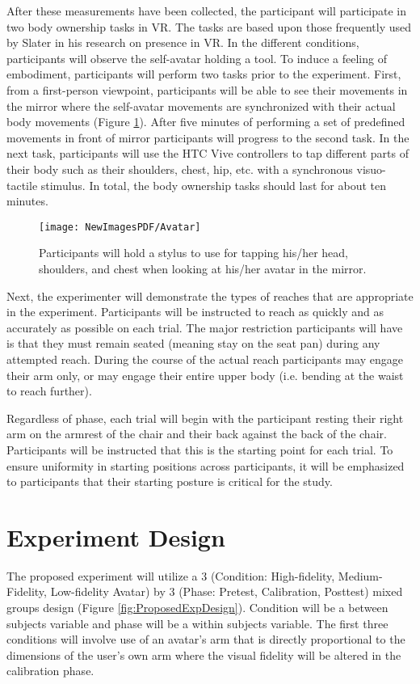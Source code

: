 After these measurements have been collected, the participant will participate in two body ownership tasks in VR. The tasks are based upon those frequently used by Slater in his research on presence in VR. In the different conditions, participants will observe the self-avatar holding a tool. To induce a feeling of embodiment, participants will perform two tasks prior to the experiment. First, from a first-person viewpoint, participants will be able to see their movements in the mirror where the self-avatar movements are synchronized with their actual body movements (Figure \ref{fig:ownership}). After five minutes of performing a set of predefined movements in front of mirror participants will progress to the second task. In the next task, participants will use the HTC Vive controllers to tap different parts of their body such as their shoulders, chest, hip, etc. with a synchronous visuo-tactile stimulus. In total, the body ownership tasks should last for about ten minutes. 

\begin{figure}
	\centering
	\texttt{[image: NewImagesPDF/Avatar]}
	\caption{Participants will hold a stylus to use for tapping his/her head, shoulders, and chest when looking at his/her avatar in the mirror.}
	\label{fig:ownership}
\end{figure}

Next, the experimenter will demonstrate the types of reaches that are appropriate in the experiment. Participants will be instructed to reach as quickly and as accurately as possible on each trial. The major restriction participants will have is that they must remain seated (meaning stay on the seat pan) during any attempted reach. During the course of the actual reach participants may engage their arm only, or may engage their entire upper body (i.e. bending at the waist to reach further).

Regardless of phase, each trial will begin with the participant resting their right arm on the armrest of the chair and their back against the back of the chair. Participants will be instructed that this is the starting point for each trial. To ensure uniformity in starting positions across participants, it will be emphasized to participants that their starting posture is critical for the study.


\section{Experiment Design} \label{ExpDesign}
The proposed experiment will utilize a 3 (Condition: High-fidelity, Medium-Fidelity, Low-fidelity Avatar) by 3 (Phase: Pretest, Calibration, Posttest) mixed groups design (Figure \ref{fig:ProposedExpDesign}). Condition will be a between subjects variable and phase will be a within subjects variable. The first three conditions will involve use of an avatar’s arm that is directly proportional to the dimensions of the user’s own arm where the visual fidelity will be altered in the calibration phase. 

